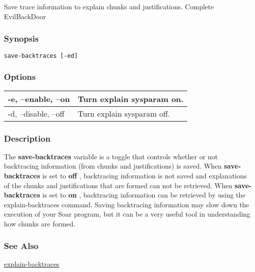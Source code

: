 \subsection{}
\label{save-backtraces}
Save trace information to explain chunks and justifications. 
 Complete EvilBackDoor
\subsubsection*{Synopsis}
\begin{verbatim}
save-backtraces [-ed]
\end{verbatim}
\subsubsection*{Options}
\begin{tabular}{|l|l|}
\hline 
 -e, --enable, --on  & Turn explain sysparam on.  \\
 \hline 
 -d, --disable, --off  & Turn explain sysparam off.  \\
 \hline 
\end{tabular}
\subsubsection*{Description}
 The \textbf{save-backtraces}
 variable is a toggle that controls whether or not backtracing information (from chunks and justifications) is saved. 
 When \textbf{save-backtraces}
 is set to \textbf{off}
, backtracing information is not saved and explanations of the chunks and justifications that are formed can not be retrieved. When \textbf{save-backtraces}
 is set to \textbf{on}
, backtracing information can be retrieved by using the explain-backtraces command. Saving backtracing information may slow down the execution of your Soar program, but it can be a very useful tool in understanding how chunks are formed. 
\subsubsection*{See Also}
\hyperref[explain-backtraces]{explain-backtraces} 
